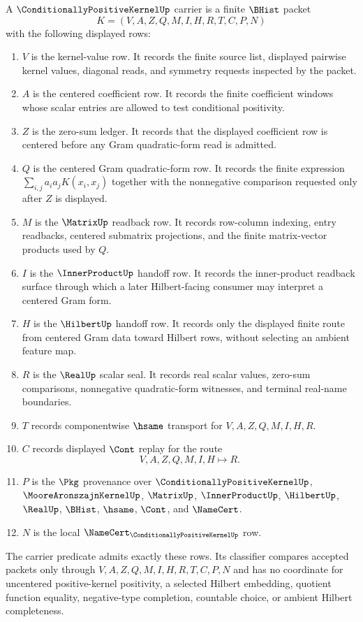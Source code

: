 \begin{definition}
\label{def:conditionally-positive-kernel-carrier}
A $\ConditionallyPositiveKernelUp$ carrier is a finite $\BHist$ packet
$$
K=(V,A,Z,Q,M,I,H,R,T,C,P,N)
$$
with the following displayed rows:
\begin{enumerate}
\item $V$ is the kernel-value row. It records the finite source list, displayed pairwise kernel values, diagonal reads, and symmetry requests inspected by the packet.
\item $A$ is the centered coefficient row. It records the finite coefficient windows whose scalar entries are allowed to test conditional positivity.
\item $Z$ is the zero-sum ledger. It records that the displayed coefficient row is centered before any Gram quadratic-form read is admitted.
\item $Q$ is the centered Gram quadratic-form row. It records the finite expression $\sum_{i,j} a_i a_j K(x_i,x_j)$ together with the nonnegative comparison requested only after $Z$ is displayed.
\item $M$ is the $\MatrixUp$ readback row. It records row-column indexing, entry readbacks, centered submatrix projections, and the finite matrix-vector products used by $Q$.
\item $I$ is the $\InnerProductUp$ handoff row. It records the inner-product readback surface through which a later Hilbert-facing consumer may interpret a centered Gram form.
\item $H$ is the $\HilbertUp$ handoff row. It records only the displayed finite route from centered Gram data toward Hilbert rows, without selecting an ambient feature map.
\item $R$ is the $\RealUp$ scalar seal. It records real scalar values, zero-sum comparisons, nonnegative quadratic-form witnesses, and terminal real-name boundaries.
\item $T$ records componentwise $\hsame$ transport for $V,A,Z,Q,M,I,H,R$.
\item $C$ records displayed $\Cont$ replay for the route
$$
V,A,Z,Q,M,I,H \longmapsto R .
$$
\item $P$ is the $\Pkg$ provenance over $\ConditionallyPositiveKernelUp$, $\MooreAronszajnKernelUp$, $\MatrixUp$, $\InnerProductUp$, $\HilbertUp$, $\RealUp$, $\BHist$, $\hsame$, $\Cont$, and $\NameCert$.
\item $N$ is the local $\NameCert_{\ConditionallyPositiveKernelUp}$ row.
\end{enumerate}
The carrier predicate admits exactly these rows. Its classifier compares accepted packets only through $V,A,Z,Q,M,I,H,R,T,C,P,N$ and has no coordinate for uncentered positive-kernel positivity, a selected Hilbert embedding, quotient function equality, negative-type completion, countable choice, or ambient Hilbert completeness.
\end{definition}

